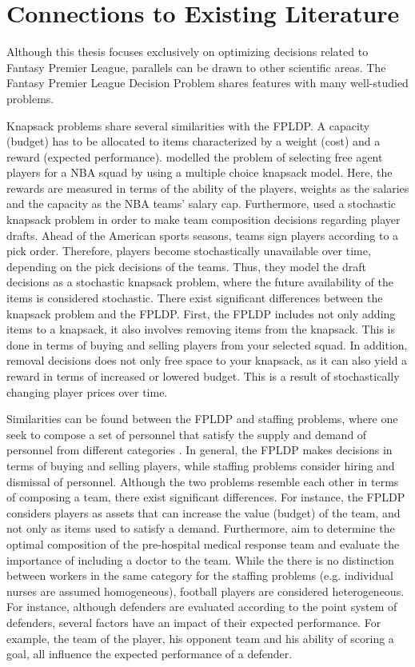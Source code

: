 \section{Connections to Existing Literature}\label{Other_Relevant_Research}
Although this thesis focuses exclusively on optimizing decisions related to Fantasy Premier League, parallels can be drawn to other scientific areas. The Fantasy Premier League Decision Problem shares features with many well-studied problems.  

\newpar

Knapsack problems share several similarities with the FPLDP. A capacity (budget) has to be allocated to items characterized by a weight (cost) and a reward (expected performance). \cite{Kirshner} modelled the problem of selecting free agent players for a NBA squad by using a multiple choice knapsack model. Here, the rewards are measured in terms of the ability of the players, weights as the salaries and the capacity as the NBA teams' salary cap. Furthermore, \cite{Gibson} used a stochastic knapsack problem in order to make team composition decisions regarding player drafts. Ahead of the American sports seasons, teams sign players according to a pick order. Therefore, players become stochastically unavailable over time, depending on the pick decisions of the teams. Thus, they model the draft decisions as a stochastic knapsack problem, where the future availability of the items is considered stochastic. There exist significant differences between the knapsack problem and the FPLDP. First, the FPLDP includes not only adding items to a knapsack, it also involves removing items from the knapsack. This is done in terms of buying and selling players from your selected squad. In addition, removal decisions does not only free space to your knapsack, as it can also yield a reward in terms of increased or lowered budget. This is a result of stochastically changing player prices over time. 

\newpar

Similarities can be found between the FPLDP and staffing problems, where one seek to compose a set of personnel that satisfy the supply and demand of personnel from different categories \citep{Komarudin,Bruecker}. In general, the FPLDP makes decisions in terms of buying and selling players, while staffing problems consider hiring and dismissal of personnel. Although the two problems resemble each other in terms of composing a team, there exist significant differences. For instance, the FPLDP considers players as assets that can increase the value (budget) of the team, and not only as items used to satisfy a demand. Furthermore, \cite{Davis} aim to determine the optimal composition of the pre-hospital medical response team and evaluate the importance of including a doctor to the team. While the there is no distinction between workers in the same category for the staffing problems (e.g. individual nurses are assumed homogeneous), football players are considered heterogeneous. For instance, although defenders are evaluated according to the point system of defenders, several factors have an impact of their expected performance. For example, the team of the player, his opponent team and his ability of scoring a goal, all influence the expected performance of a defender.

